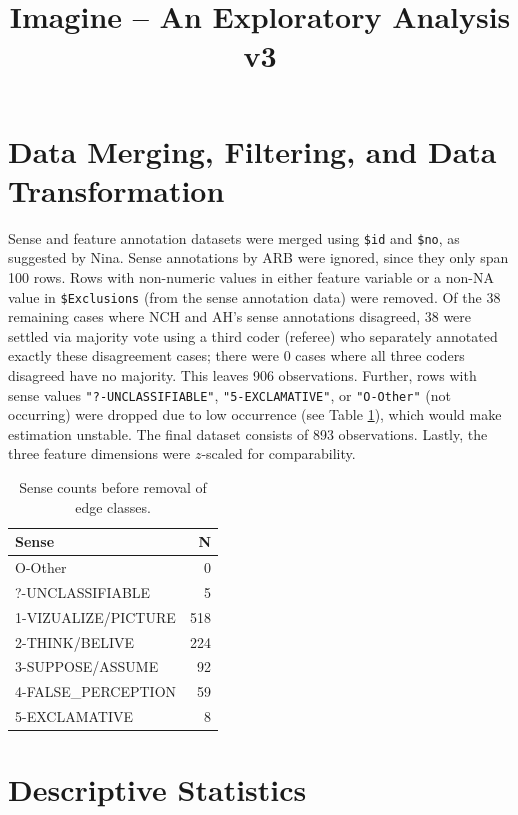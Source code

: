 \documentclass[
]{article}
\title{Imagine -- An Exploratory Analysis v3}
\author{}
\date{\vspace{-2.5em}}
\begin{document}
\maketitle

\section{Data Merging, Filtering, and Data
Transformation}\label{data-merging-filtering-and-data-transformation}

Sense and feature annotation datasets were merged using \texttt{\$id}
and \texttt{\$no}, as suggested by Nina. Sense annotations by ARB were
ignored, since they only span 100 rows. Rows with non-numeric values in
either feature variable or a non-NA value in \texttt{\$Exclusions} (from
the sense annotation data) were removed. Of the 38 remaining cases where
NCH and AH's sense annotations disagreed, 38 were settled via majority
vote using a third coder (referee) who separately annotated exactly
these disagreement cases; there were 0 cases where all three coders
disagreed have no majority. This leaves 906 observations. Further, rows
with sense values \texttt{"?-UNCLASSIFIABLE"}, \texttt{"5-EXCLAMATIVE"},
or \texttt{"O-Other"} (not occurring) were dropped due to low occurrence
(see Table \ref{tab:senseCounts}), which would make estimation unstable.
The final dataset consists of 893 observations. Lastly, the three
feature dimensions were \(z\)-scaled for comparability.

\begin{table}[H]
\centering
\caption{\label{tab:unnamed-chunk-2}\label{tab:senseCounts} Sense counts before removal of edge classes.}
\centering
\begin{tabular}[t]{lr}
\toprule
Sense & N\\
\midrule
O-Other & 0\\
?-UNCLASSIFIABLE & 5\\
1-VIZUALIZE/PICTURE & 518\\
2-THINK/BELIVE & 224\\
3-SUPPOSE/ASSUME & 92\\
4-FALSE\_PERCEPTION & 59\\
5-EXCLAMATIVE & 8\\
\bottomrule
\end{tabular}
\end{table}

\pagebreak

\section{Descriptive Statistics}\label{descriptive-statistics}
\end{document}
